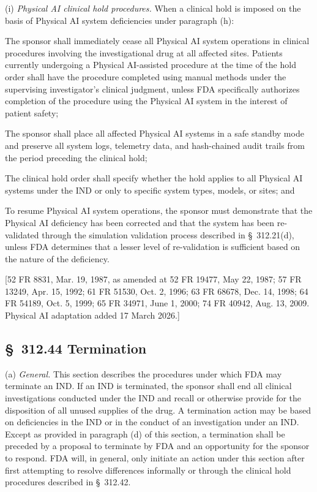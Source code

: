 \documentclass[11pt]{article}
\begin{document}
(i) \textit{Physical AI clinical hold procedures.} When a clinical hold is imposed on the basis of Physical AI system deficiencies under paragraph (h):

\begin{description}[leftmargin=0.8cm,style=sameline]
\item[(i)] The sponsor shall immediately cease all Physical AI system operations in clinical procedures involving the investigational drug at all affected sites. Patients currently undergoing a Physical AI-assisted procedure at the time of the hold order shall have the procedure completed using manual methods under the supervising investigator's clinical judgment, unless FDA specifically authorizes completion of the procedure using the Physical AI system in the interest of patient safety;
\item[(ii)] The sponsor shall place all affected Physical AI systems in a safe standby mode and preserve all system logs, telemetry data, and hash-chained audit trails from the period preceding the clinical hold;
\item[(iii)] The clinical hold order shall specify whether the hold applies to all Physical AI systems under the IND or only to specific system types, models, or sites; and
\item[(iv)] To resume Physical AI system operations, the sponsor must demonstrate that the Physical AI deficiency has been corrected and that the system has been re-validated through the simulation validation process described in \S~312.21(d), unless FDA determines that a lesser level of re-validation is sufficient based on the nature of the deficiency.
\end{description}

[52 FR 8831, Mar. 19, 1987, as amended at 52 FR 19477, May 22, 1987; 57 FR 13249, Apr. 15, 1992; 61 FR 51530, Oct. 2, 1996; 63 FR 68678, Dec. 14, 1998; 64 FR 54189, Oct. 5, 1999; 65 FR 34971, June 1, 2000; 74 FR 40942, Aug. 13, 2009. Physical AI adaptation added 17 March 2026.]

\subsection{\S~312.44 Termination}

(a) \textit{General.} This section describes the procedures under which FDA may terminate an IND. If an IND is terminated, the sponsor shall end all clinical investigations conducted under the IND and recall or otherwise provide for the disposition of all unused supplies of the drug. A termination action may be based on deficiencies in the IND or in the conduct of an investigation under an IND. Except as provided in paragraph (d) of this section, a termination shall be preceded by a proposal to terminate by FDA and an opportunity for the sponsor to respond. FDA will, in general, only initiate an action under this section after first attempting to resolve differences informally or through the clinical hold procedures described in \S~312.42.
\end{document}
